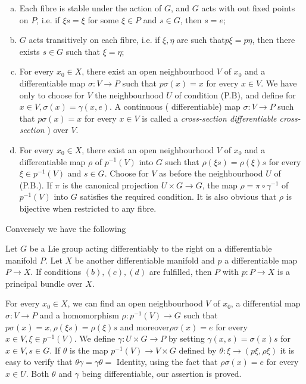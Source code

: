 \begin{enumerate}[a)]
\item Each fibre is stable under the action of $G$, and $G$ acts with
  out fixed points on $P$, i.e. if $ \xi s = \xi $ for some $ \xi \in
  P$ and  $ s \in G $, then $s = e$; 
\item $G$ acts transitively on each fibre, i.e. if $ \xi, \eta $ are
  such that\pageoriginale $ p \xi = p \eta $, then there exists $ s \in G $ such
  that $ \xi = \eta$; 
\item For every  $x_0 \in X$, there exist an open neighbourhood $V$
  of $x_0$ and a  differentiable map $ \sigma : V \to P $ such that $
  p \sigma (x) = x$ for every $ x \in V $. We have only to choose for
  $V$ the neighbourhood $U$ of condition  (P.B), and define for $ x
  \in V, \sigma (x) = \gamma ( x,e ) $. A continuous (\resp
  differentiable) map $ \sigma : V \to P $ such that  $ p 
  \sigma (x) = x $ for every $x \in V$ is called a \textit{
    cross-section \resp differentiable cross-section }) over $V$. 
\item For every $ x_0 \in X $, there exist an open neighbourhood $V$
  of $x_0$ and a differentiable map $\rho$ of $p^{-1} (V) $ into $G$
  such that $ \rho ( \xi s ) = \rho (\xi) s $ for every $ \xi \in
  p^{-1} (V) $ and $ s \in G $. Choose for $V$ as before the
  neighbourhood $U$ of (P.B.). If $ \pi $ is the canonical
  projection $ U \times G \to G $, the map $ \rho = \pi \circ \gamma^{-1}
  $ of  $ p^{-1} (V) $ into  $G$ satisfies the required condition. It
  is also obvious that $\rho$ is bijective when restricted to any
  fibre. 
\end{enumerate}   
   
Conversely we have the following
\begin{proposition}\label{chap2:sec1:prop1}%
  Let $G$ be a Lie group acting differentiably to the right on a
  differentiable manifold $P$. Let $X$ be  another differentiable
  manifold and $p$ a  differentiable map $ P \to X $. If conditions
  $(b) , (c), (d)$ are fulfilled, then $P$ with $ p: P \to X $ is a
  principal bundle over $X$. 
\end{proposition}   
   
For every $ x_0 \in X $, we can find an open neighbourhood $V$ of
$x_0$, a differential map $ \sigma : V \to P $ and a homomorphism $
\rho : p^{-1} (V) \to G $ such that $ p \sigma (x) = x, \rho (\xi s )
= \rho (\xi) s $ and moreover\pageoriginale $\rho \sigma (x) = e $ for every $ x
\in V , \xi \in p^{-1} (V) $. We  define  $ \gamma : U \times G \to P
$ by setting $ \gamma (x,s) = \sigma (x)s $ for $ x \in V ,  s \in G
$. If $\theta$ is the map $ p^{-1} (V) \to V \times G $ defined by $
\theta : \xi \to ( p \xi ,\rho  \xi ) $ it is easy to verify that  $
\theta \gamma = \gamma \theta = $ Identity, using the fact  that  $
\rho \sigma (x) = e $ for every $ x \in U $. Both $\theta$ and $\gamma$
being differentiable, our assertion is proved. 
   

